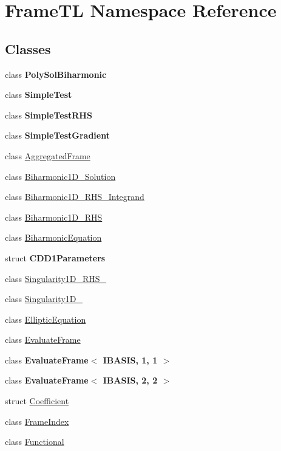 \hypertarget{namespaceFrameTL}{
\section{FrameTL Namespace Reference}
\label{namespaceFrameTL}
}


\subsection*{Classes}
\begin{CompactItemize}
\item 
class \textbf{PolySolBiharmonic}
\item 
class \textbf{SimpleTest}
\item 
class \textbf{SimpleTestRHS}
\item 
class \textbf{SimpleTestGradient}
\item 
class \hyperlink{classFrameTL_1_1AggregatedFrame}{AggregatedFrame}
\item 
class \hyperlink{classFrameTL_1_1Biharmonic1D__Solution}{Biharmonic1D\_\-Solution}
\item 
class \hyperlink{classFrameTL_1_1Biharmonic1D__RHS__Integrand}{Biharmonic1D\_\-RHS\_\-Integrand}
\item 
class \hyperlink{classFrameTL_1_1Biharmonic1D__RHS}{Biharmonic1D\_\-RHS}
\item 
class \hyperlink{classFrameTL_1_1BiharmonicEquation}{BiharmonicEquation}
\item 
struct \textbf{CDD1Parameters}
\item 
class \hyperlink{classFrameTL_1_1Singularity1D__RHS__2}{Singularity1D\_\-RHS\_}
\item 
class \hyperlink{classFrameTL_1_1Singularity1D__2}{Singularity1D\_}
\item 
class \hyperlink{classFrameTL_1_1EllipticEquation}{EllipticEquation}
\item 
class \hyperlink{classFrameTL_1_1EvaluateFrame}{EvaluateFrame}
\item 
class \textbf{EvaluateFrame$<$ IBASIS, 1, 1 $>$}
\item 
class \textbf{EvaluateFrame$<$ IBASIS, 2, 2 $>$}
\item 
struct \hyperlink{structFrameTL_1_1Coefficient}{Coefficient}
\item 
class \hyperlink{classFrameTL_1_1FrameIndex}{FrameIndex}
\item 
class \hyperlink{classFrameTL_1_1Functional}{Functional}
\item 

\end{CompactItemize}

